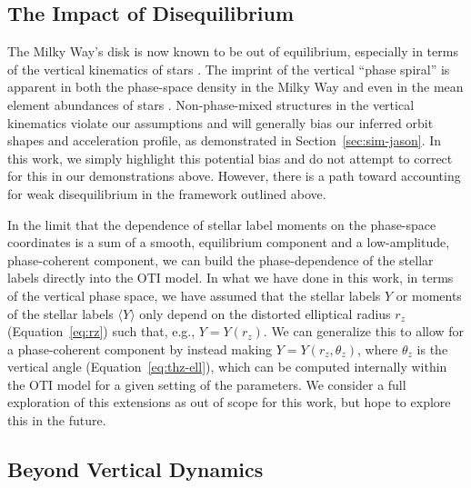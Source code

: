\documentclass[modern]{aastex631}
\newcommand{\rz}{\ensuremath{r_z}}
\begin{document}
\subsection{The Impact of Disequilibrium} \label{sec:disc-diseq}

The Milky Way's disk is now known to be out of equilibrium, especially in terms of the
vertical kinematics of stars \citep[e.g.,][]{Antoja:2018, Katz:2018, Ramos:2018,
Tian:2018, Laporte:2019, Khanna:2019, Hunt:2022, Darragh-Ford:2023}.
The imprint of the vertical ``phase spiral'' is apparent in both the phase-space density
in the Milky Way and even in the mean element abundances of stars
\citep{Frankel:inprep}.
Non-phase-mixed structures in the vertical kinematics violate our assumptions and will
generally bias our inferred orbit shapes and acceleration profile, as demonstrated in
Section~\ref{sec:sim-jason}.
In this work, we simply highlight this potential bias and do not attempt to correct for
this in our demonstrations above.
However, there is a path toward accounting for weak disequilibrium in the framework
outlined above.

In the limit that the dependence of stellar label moments on the phase-space coordinates
is a sum of a smooth, equilibrium component and a low-amplitude, phase-coherent
component, we can build the phase-dependence of the stellar labels directly into the OTI
model.
In what we have done in this work, in terms of the vertical phase space, we have assumed
that the stellar labels $Y$ or moments of the stellar labels $\langle Y \rangle$ only
depend on the distorted elliptical radius $\rz$ (Equation~\ref{eq:rz}) such that, e.g.,
$Y = Y(\rz)$.
We can generalize this to allow for a phase-coherent component by instead making $Y =
Y(\rz, \theta_z)$, where $\theta_z$ is the vertical angle (Equation~\ref{eq:thz-ell}),
which can be computed internally within the OTI model for a given setting of the
parameters.
We consider a full exploration of this extensions as out of scope for this work, but
hope to explore this in the future.


\subsection{Beyond Vertical Dynamics} \label{sec:disc-beyond-vertical}
\end{document}
